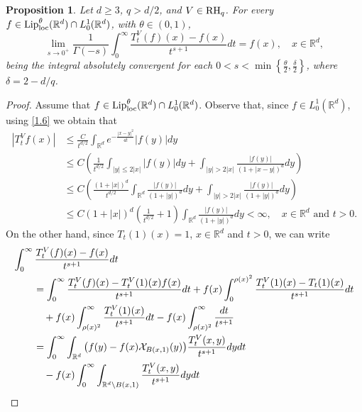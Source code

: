 \documentclass[10pt, a4paper, reqno]{amsart}
\newtheorem{prop}[thm]{Proposition}
\theoremstyle{definition}
\theoremstyle{remark}
\numberwithin{equation}{section}
\begin{document}
\begin{prop}\label{PropLips} 
Let $d\geq 3$, $q>d/2$, and $V\in {\rm RH}_q$. For every $f\in {\textup{Lip}}_\textup{loc}^\theta (\mathbb R^d)\cap L^1_0(\mathbb R^d)$, with $\theta \in (0,1)$, 
\begin{equation}\label{limLips}
\lim_{s\rightarrow 0^+}\frac{1}{\Gamma (-s)}\int_0^\infty \frac{T_t^V(f)(x)-f(x)}{t^{s+1}}dt=f(x),\quad x\in \mathbb R^d,
\end{equation}
being the integral absolutely convergent for each $0<s<\min\left\{\tfrac{\theta}{2},\tfrac{\delta}{2}\right\}$, where \linebreak ${\delta =2-d/q}$. 
\end{prop}
\begin{proof}
Assume that $f\in {\textup{Lip}}_\textup{loc}^\theta (\mathbb R^d)\cap L^1_0(\mathbb R^d)$. Observe that, since $f\in L^1_0(\mathbb R^d)$, using \eqref{1.6} we obtain that 
\begin{align*}
|T_t^Vf(x)|&\leq \frac{C}{t^{d/2}}\int_{\mathbb R^d}e^{-\frac{|x-y|^2}{4t}}|f(y)|dy\\
&\leq C\left(\frac{1}{t^{d/2}}\int_{|y|\leq 2|x|}|f(y)|dy+\int_{|y|>2|x|}\frac{|f(y)|}{(1+|x-y|)^d}dy\right)\\
 &\leq C\left(\frac{(1+|x|)^d}{t^{d/2}}\int_{\mathbb R^d}\frac{|f(y)|}{(1+|y|)^d}dy+\int_{|y|>2|x|}\frac{|f(y)|}{(1+|y|)^d}dy\right)\\
 & \leq C(1+|x|)^d\left(\frac{1}{t^{d/2}}+1\right)\int_{\mathbb R^d}\frac{|f(y)|}{(1+|y|)^d}dy<\infty,\quad x\in \mathbb R^d\mbox{ and }t>0.
\end{align*}
On the other hand, since $T_t(1)(x)=1$, $x\in \mathbb R^d$ and $t>0$, we can write
\begin{align}\label{sumI}
   \int_0^\infty \frac{T_t^V(f)(x)-f(x)}{t^{s+1}}dt&\nonumber\\
   &\hspace{-3cm}=\int_0^\infty \frac{T_t^V(f)(x)-T_t^V(1)(x)f(x)}{t^{s+1}}dt+f(x)\int_0^{\rho (x)^2}\frac{T_t^V(1)(x)-T_t(1)(x)}{t^{s+1}}dt\nonumber\\
    &\hspace{-3cm}\quad +f(x)\int_{\rho (x)^2}^\infty \frac{T_t^V(1)(x)}{t^{s+1}}dt-f(x)\int_{\rho (x)^2}^\infty \frac{dt}{t^{s+1}}\nonumber\\
    &\hspace{-3cm}= \int_0^\infty\int_{\mathbb R^d}\big(f(y)-f(x)\mathcal X_{B(x,1)}(y)\big)\frac{T_t^V(x,y)}{t^{s+1}}dydt\nonumber\\
    &\hspace{-3cm}\quad -f(x) \int_0^\infty\int_{\mathbb R^d\setminus B(x,1)}\frac{T_t^V(x,y)}{t^{s+1}}dydt\nonumber\\

\end{align}
\end{proof}
\end{document}
